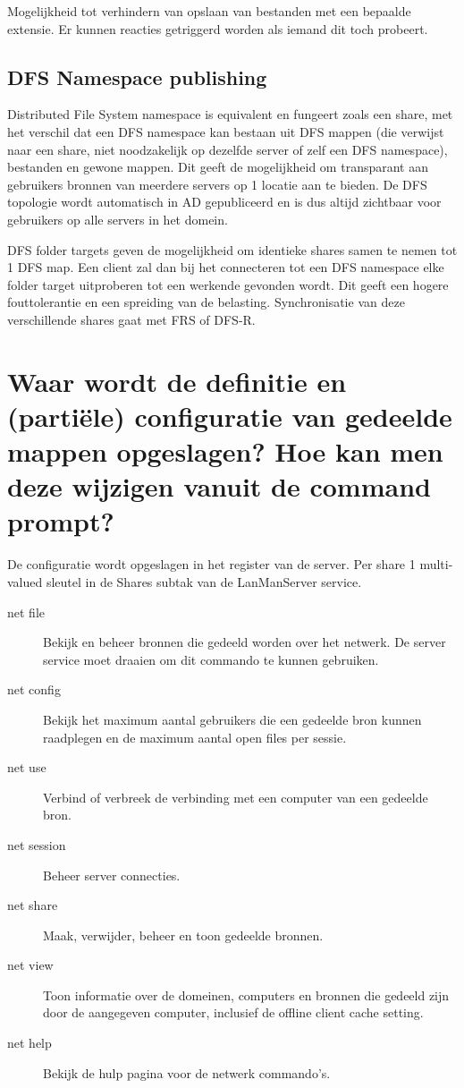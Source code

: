 Mogelijkheid tot verhindern van opslaan van bestanden met een bepaalde extensie.
Er kunnen reacties getriggerd worden als iemand dit toch probeert.

\subsection{DFS Namespace publishing}

Distributed File System namespace is equivalent en fungeert zoals een share, met
het verschil dat een DFS namespace kan bestaan uit DFS mappen (die verwijst naar
een share, niet noodzakelijk op dezelfde server of zelf een DFS namespace),
bestanden en gewone mappen. Dit geeft de mogelijkheid om transparant aan
gebruikers bronnen van meerdere servers op 1 locatie aan te bieden. De DFS
topologie wordt automatisch in AD gepubliceerd en is dus altijd zichtbaar voor
gebruikers op alle servers in het domein.

DFS folder targets geven de mogelijkheid om identieke shares samen te nemen tot
1 DFS map. Een client zal dan bij het connecteren tot een DFS namespace elke
folder target uitproberen tot een werkende gevonden wordt. Dit geeft een hogere
fouttolerantie en een spreiding van de belasting. Synchronisatie van deze
verschillende shares gaat met FRS of DFS-R.

\section{Waar wordt de definitie en (partiële) configuratie van gedeelde mappen
opgeslagen? Hoe kan men deze wijzigen vanuit de command prompt?}

De configuratie wordt opgeslagen in het register van de server. Per share 1
multi-valued sleutel in de Shares subtak van de LanManServer service.

\begin{description}
	\item[net file] Bekijk en beheer bronnen die gedeeld worden over het
		netwerk. De server service moet draaien om dit commando te
		kunnen gebruiken.
	\item[net config] Bekijk het maximum aantal gebruikers die een gedeelde
		bron kunnen raadplegen en de maximum aantal open files per
		sessie.
	\item[net use] Verbind of verbreek de verbinding met een computer van
		een gedeelde bron.
	\item[net session] Beheer server connecties.
	\item[net share] Maak, verwijder, beheer en toon gedeelde bronnen.
	\item[net view] Toon informatie over de domeinen, computers en bronnen
		die gedeeld zijn door de aangegeven computer, inclusief de
		offline client cache setting.
	\item[net help] Bekijk de hulp pagina voor de netwerk commando's.

\end{description}

